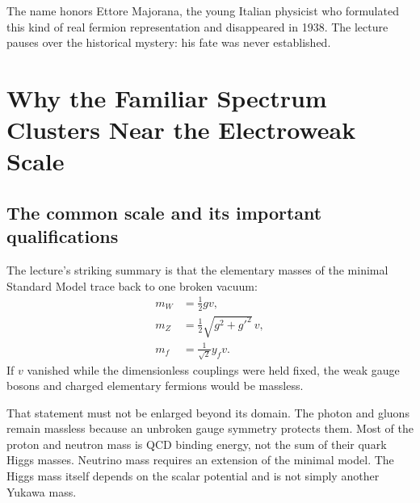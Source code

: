 The name honors Ettore Majorana, the young Italian physicist who formulated
this kind of real fermion representation and disappeared in 1938. The
lecture pauses over the historical mystery: his fate was never established.

\section{Why the Familiar Spectrum Clusters Near the Electroweak Scale}

\subsection{The common scale and its important qualifications}

\begin{classroomqa}
\end{classroomqa}

The lecture's striking summary is that the elementary masses of the minimal
Standard Model trace back to one broken vacuum:
\begin{align}
  m_W&=\frac12gv,\\
  m_Z&=\frac12\sqrt{g^2+g'^2}\,v,\\
  m_f&=\frac1{\sqrt2}y_fv.
  \label{eq:l09-electroweak-mass-summary}
\end{align}
If \(v\) vanished while the dimensionless couplings were held fixed, the
weak gauge bosons and charged elementary fermions would be massless.

That statement must not be enlarged beyond its domain. The photon and
gluons remain massless because an unbroken gauge symmetry protects them.
Most of the proton and neutron mass is QCD binding energy, not the sum of
their quark Higgs masses. Neutrino mass requires an extension of the
minimal model. The Higgs mass itself depends on the scalar potential and is
not simply another Yukawa mass.

